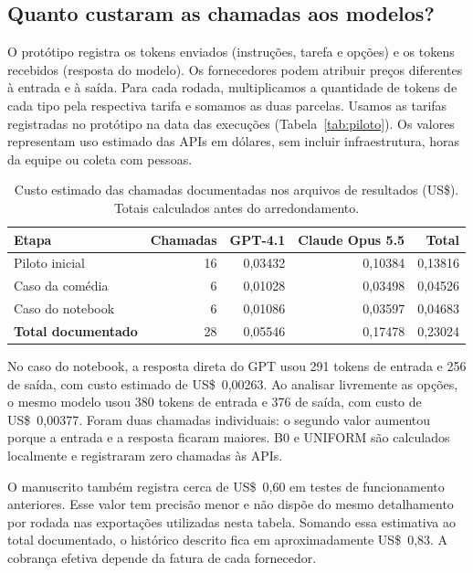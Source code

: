 \documentclass[12pt]{article}
\begin{document}
\subsection{Quanto custaram as chamadas aos modelos?}
\label{sec:custos}
O protótipo registra os tokens enviados (instruções, tarefa e opções) e os tokens recebidos (resposta do modelo). Os fornecedores podem atribuir preços diferentes à entrada e à saída. Para cada rodada, multiplicamos a quantidade de tokens de cada tipo pela respectiva tarifa e somamos as duas parcelas. Usamos as tarifas registradas no protótipo na data das execuções (Tabela~\ref{tab:piloto}). Os valores representam uso estimado das APIs em dólares, sem incluir infraestrutura, horas da equipe ou coleta com pessoas.

\begin{table}[!htb]\centering\small\caption{Custo estimado das chamadas documentadas nos arquivos de resultados (US\$). Totais calculados antes do arredondamento.}\label{tab:custos}
\begin{tabular}{lrrrr}\toprule
Etapa & Chamadas & GPT-4.1 & Claude Opus 5.5 & Total \\ \midrule
Piloto inicial & 16 & 0,03432 & 0,10384 & 0,13816 \\
Caso da comédia & 6 & 0,01028 & 0,03498 & 0,04526 \\
Caso do notebook & 6 & 0,01086 & 0,03597 & 0,04683 \\
\textbf{Total documentado} & 28 & 0,05546 & 0,17478 & 0,23024 \\
\bottomrule\end{tabular}\end{table}

No caso do notebook, a resposta direta do GPT usou 291 tokens de entrada e 256 de saída, com custo estimado de US\$~0,00263. Ao analisar livremente as opções, o mesmo modelo usou 380 tokens de entrada e 376 de saída, com custo de US\$~0,00377. Foram duas chamadas individuais: o segundo valor aumentou porque a entrada e a resposta ficaram maiores. B0 e UNIFORM são calculados localmente e registraram zero chamadas às APIs.

O manuscrito também registra cerca de US\$~0,60 em testes de funcionamento anteriores. Esse valor tem precisão menor e não dispõe do mesmo detalhamento por rodada nas exportações utilizadas nesta tabela. Somando essa estimativa ao total documentado, o histórico descrito fica em aproximadamente US\$~0,83. A cobrança efetiva depende da fatura de cada fornecedor.
\end{document}
